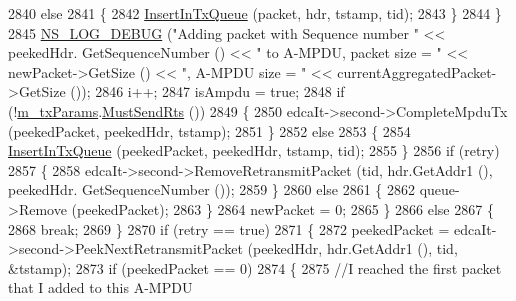 \begin{DoxyCode}
2840                           \textcolor{keywordflow}{else}
2841                             \{
2842                               \hyperlink{classns3_1_1MacLow_a4b03d2fed3abc0e1acc14b3b1ef808a1}{InsertInTxQueue} (packet, hdr, tstamp, tid);
2843                             \}
2844                         \}
2845                       \hyperlink{group__logging_ga413f1886406d49f59a6a0a89b77b4d0a}{NS\_LOG\_DEBUG} (\textcolor{stringliteral}{"Adding packet with Sequence number "} << peekedHdr.
      GetSequenceNumber () << \textcolor{stringliteral}{" to A-MPDU, packet size = "} << newPacket->GetSize () << \textcolor{stringliteral}{", A-MPDU size = "} << 
      currentAggregatedPacket->GetSize ());
2846                       i++;
2847                       isAmpdu = \textcolor{keyword}{true};
2848                       \textcolor{keywordflow}{if} (!\hyperlink{classns3_1_1MacLow_a1c5ce6a0415d4a6d394bc9fc8f78327d}{m\_txParams}.\hyperlink{classns3_1_1MacLowTransmissionParameters_a84f6c50f9cbd717e5191e178ae05b331}{MustSendRts} ())
2849                         \{
2850                           edcaIt->second->CompleteMpduTx (peekedPacket, peekedHdr, tstamp);
2851                         \}
2852                       \textcolor{keywordflow}{else}
2853                         \{
2854                           \hyperlink{classns3_1_1MacLow_a4b03d2fed3abc0e1acc14b3b1ef808a1}{InsertInTxQueue} (peekedPacket, peekedHdr, tstamp, tid);
2855                         \}
2856                       \textcolor{keywordflow}{if} (retry)
2857                         \{
2858                           edcaIt->second->RemoveRetransmitPacket (tid, hdr.GetAddr1 (), peekedHdr.
      GetSequenceNumber ());
2859                         \}
2860                       \textcolor{keywordflow}{else}
2861                         \{
2862                           queue->Remove (peekedPacket);
2863                         \}
2864                       newPacket = 0;
2865                     \}
2866                   \textcolor{keywordflow}{else}
2867                     \{
2868                       \textcolor{keywordflow}{break};
2869                     \}
2870                   \textcolor{keywordflow}{if} (retry == \textcolor{keyword}{true})
2871                     \{
2872                       peekedPacket = edcaIt->second->PeekNextRetransmitPacket (peekedHdr, hdr.GetAddr1 (), 
      tid, &tstamp);
2873                       \textcolor{keywordflow}{if} (peekedPacket == 0)
2874                         \{
2875                           \textcolor{comment}{//I reached the first packet that I added to this A-MPDU}

\end{DoxyCode}
